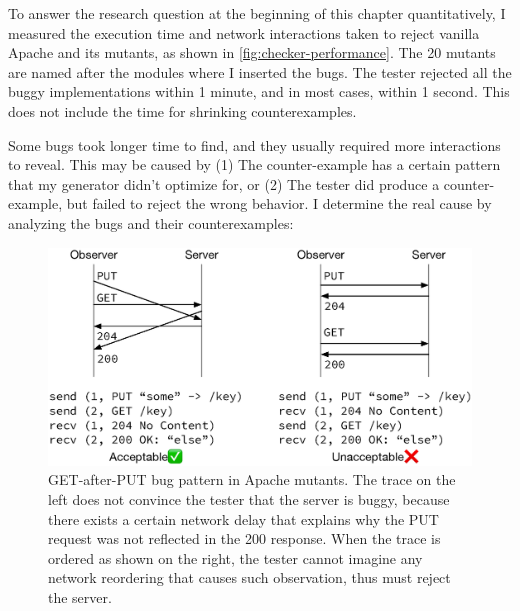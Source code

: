 To answer the research question at the beginning of this chapter quantitatively,
I measured the execution time and network interactions taken to reject vanilla
Apache and its mutants, as shown in \autoref{fig:checker-performance}.  The 20
mutants are named after the modules where I inserted the bugs.  The tester
rejected all the buggy implementations within 1 minute, and in most cases,
within 1 second.  This does not include the time for shrinking counterexamples.

Some bugs took longer time to find, and they usually required more interactions
to reveal.  This may be caused by (1) The counter-example has a certain pattern
that my generator didn't optimize for, or (2) The tester did produce a
counter-example, but failed to reject the wrong behavior.  I determine the real
cause by analyzing the bugs and their counterexamples:

\begin{figure}
  \includegraphics[width=\linewidth]{figures/http-put-bug}
  \caption[GET-after-PUT bug pattern in Apache mutants.]{GET-after-PUT bug
    pattern in Apache mutants.  The trace on the left does not convince the
    tester that the server is buggy, because there exists a certain network
    delay that explains why the PUT request was not reflected in the 200
    response.  When the trace is ordered as shown on the right, the tester
    cannot imagine any network reordering that causes such observation, thus
    must reject the server.}
  \label{fig:put-bug}
\end{figure}
  

